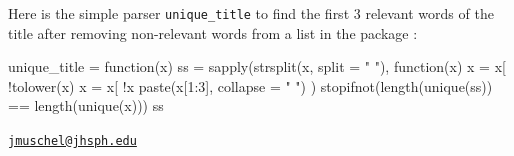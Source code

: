 Here is the simple parser \texttt{unique\_title} to find the first 3
relevant words of the title after removing non-relevant words from a
list in the  package \citep{stopwords}:

\begin{Schunk}
\begin{Sinput}
unique_title = function(x) {
  ss = sapply(strsplit(x, split = " "), 
              function(x) {
                x = x[ !tolower(x) %
                x = x[ !x %
                paste(x[1:3], collapse = " ")
              })
  stopifnot(length(unique(ss)) == length(unique(x)))
  ss
}
\end{Sinput}
\end{Schunk}



\address{%
John Muschelli\\
Department of Biostatistics, Johns Hopkins Bloomberg School of Public
Health\\
615 N Wolfe St Baltimore, MD 21205\\
}
\href{mailto:jmuschel@jhsph.edu}{\nolinkurl{jmuschel@jhsph.edu}}

